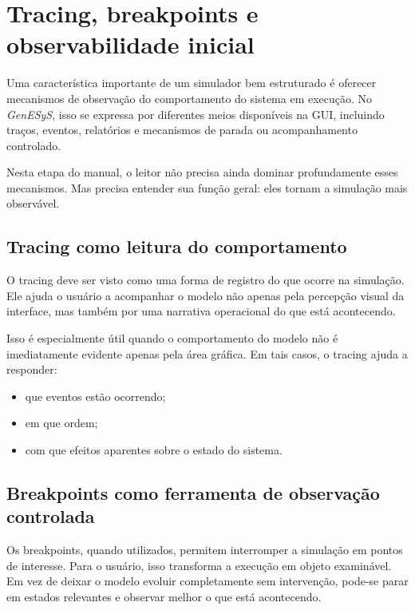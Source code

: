 \section{Tracing, breakpoints e observabilidade inicial}
\label{sec:cap5_tracing_breakpoints_observabilidade}

Uma característica importante de um simulador bem estruturado é oferecer mecanismos de observação do comportamento do sistema em execução. No \textit{GenESyS}, isso se expressa por diferentes meios disponíveis na GUI, incluindo traços, eventos, relatórios e mecanismos de parada ou acompanhamento controlado.

Nesta etapa do manual, o leitor não precisa ainda dominar profundamente esses mecanismos. Mas precisa entender sua função geral: eles tornam a simulação mais observável.

\subsection{Tracing como leitura do comportamento}
\label{subsec:cap5_tracing_leitura_comportamento}

O tracing deve ser visto como uma forma de registro do que ocorre na simulação. Ele ajuda o usuário a acompanhar o modelo não apenas pela percepção visual da interface, mas também por uma narrativa operacional do que está acontecendo.

Isso é especialmente útil quando o comportamento do modelo não é imediatamente evidente apenas pela área gráfica. Em tais casos, o tracing ajuda a responder:
\begin{itemize}
    \item que eventos estão ocorrendo;
    \item em que ordem;
    \item com que efeitos aparentes sobre o estado do sistema.
\end{itemize}

\subsection{Breakpoints como ferramenta de observação controlada}
\label{subsec:cap5_breakpoints_observacao_controlada}

Os breakpoints, quando utilizados, permitem interromper a simulação em pontos de interesse. Para o usuário, isso transforma a execução em objeto examinável. Em vez de deixar o modelo evoluir completamente sem intervenção, pode-se parar em estados relevantes e observar melhor o que está acontecendo.

